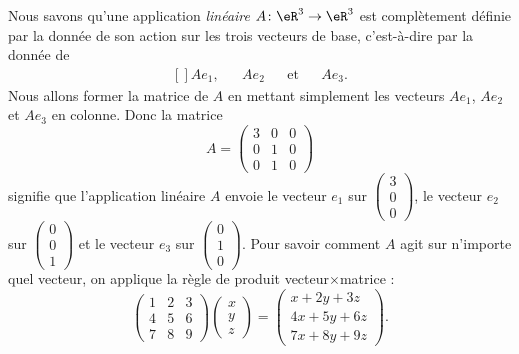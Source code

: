Nous savons qu'une application \emph{linéaire} $A\colon \eR^3\to \eR^3$ est complètement définie par la donnée de son action sur les trois vecteurs de base, c'est-à-dire par la donnée de
\begin{equation}
	\begin{aligned}[]
		Ae_1,&&Ae_2&&\text{et}&&Ae_3.
	\end{aligned}
\end{equation}
Nous allons former la matrice de $A$ en mettant simplement les vecteurs $Ae_1$, $Ae_2$ et $Ae_3$ en colonne. Donc la matrice
\begin{equation}		\label{EqExempleALin}
	A=\begin{pmatrix}
		3	&	0	&	0	\\
		0	&	1	&	0	\\
		0	&	1	&	0
	\end{pmatrix}
\end{equation}
signifie que l'application linéaire $A$ envoie le vecteur $e_1$ sur $\begin{pmatrix}
	3	\\
	0	\\
	0
\end{pmatrix}$, le vecteur $e_2$ sur $\begin{pmatrix}
	0	\\
	0	\\
	1
\end{pmatrix}$ et le vecteur $e_3$ sur $\begin{pmatrix}
	0	\\
	1	\\
	0
\end{pmatrix}$.
Pour savoir comment $A$ agit sur n'importe quel vecteur, on applique la règle de produit vecteur$\times$matrice :
\begin{equation}
	\begin{pmatrix}
		1	&	2	&	3	\\
		4	&	5	&	6	\\
		7	&	8	&	9
	\end{pmatrix}\begin{pmatrix}
		x	\\
		y	\\
		z
	\end{pmatrix}=
	\begin{pmatrix}
		x+2y+3z	\\
		4x+5y+6z	\\
		7x+8y+9z
	\end{pmatrix}.
\end{equation}

